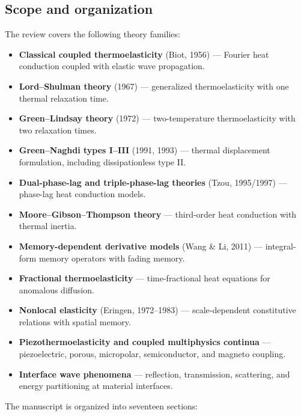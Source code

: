 \subsection{Scope and organization}

The review covers the following theory families:

\begin{itemize}
\item \textbf{Classical coupled thermoelasticity} (Biot, 1956) — Fourier heat conduction coupled with elastic wave propagation.
\item \textbf{Lord--Shulman theory} (1967) — generalized thermoelasticity with one thermal relaxation time.
\item \textbf{Green--Lindsay theory} (1972) — two-temperature thermoelasticity with two relaxation times.
\item \textbf{Green--Naghdi types I--III} (1991, 1993) — thermal displacement formulation, including dissipationless type II.
\item \textbf{Dual-phase-lag and triple-phase-lag theories} (Tzou, 1995/1997) — phase-lag heat conduction models.
\item \textbf{Moore--Gibson--Thompson theory} — third-order heat conduction with thermal inertia.
\item \textbf{Memory-dependent derivative models} (Wang \& Li, 2011) — integral-form memory operators with fading memory.
\item \textbf{Fractional thermoelasticity} — time-fractional heat equations for anomalous diffusion.
\item \textbf{Nonlocal elasticity} (Eringen, 1972--1983) — scale-dependent constitutive relations with spatial memory.
\item \textbf{Piezothermoelasticity and coupled multiphysics continua} — piezoelectric, porous, micropolar, semiconductor, and magneto coupling.
\item \textbf{Interface wave phenomena} — reflection, transmission, scattering, and energy partitioning at material interfaces.
\end{itemize}

The manuscript is organized into seventeen sections:

